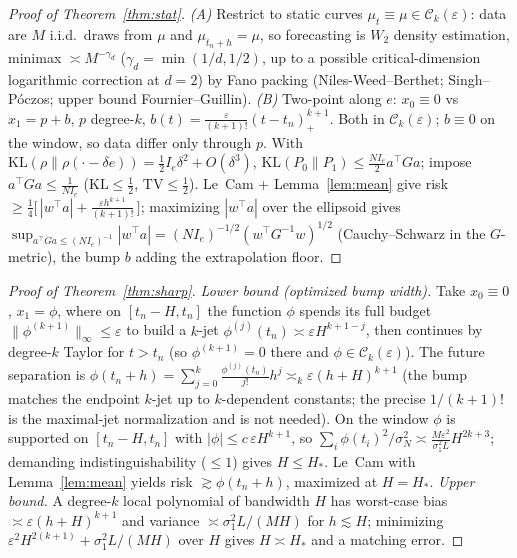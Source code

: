 \documentclass[11pt]{article}
\theoremstyle{definition}
\theoremstyle{remark}
\newcommand{\Ck}{\mathcal{C}_k(\varepsilon)}
\newcommand{\KL}{\mathrm{KL}}
\newcommand{\TV}{\mathrm{TV}}
\begin{document}
\begin{proof}[Proof of Theorem~\ref{thm:stat}]
\emph{(A)} Restrict to static curves $\mu_t\equiv\mu\in\Ck$: data are $M$ i.i.d.\ draws
from $\mu$ and $\mu_{t_n+h}=\mu$, so forecasting is $W_2$ density estimation, minimax
$\asymp M^{-\gamma_d}$ ($\gamma_d=\min(1/d,1/2)$, up to a possible critical-dimension logarithmic
correction at $d=2$) by Fano packing (Niles-Weed--Berthet; Singh--P\'oczos; upper bound
Fournier--Guillin).
\emph{(B)} Two-point along $e$: $x_0\equiv0$ vs $x_1=p+b$, $p$ degree-$k$,
$b(t)=\frac{\varepsilon}{(k+1)!}(t-t_n)_+^{k+1}$. Both in $\Ck$; $b\equiv0$ on the window,
so data differ only through $p$. With $\KL(\rho\|\rho(\cdot-\delta e))=\tfrac12 I_e\delta^2
+O(\delta^3)$, $\KL(P_0\|P_1)\le\frac{N I_e}{2}a^\top G a$; impose $a^\top G a\le\frac1{N I_e}$
($\KL\le\tfrac12$, $\TV\le\tfrac12$). Le~Cam + Lemma~\ref{lem:mean} give risk
$\ge\frac14\big[\,|w^\top a|+\frac{\varepsilon h^{k+1}}{(k+1)!}\,\big]$; maximizing $|w^\top a|$ over the
ellipsoid gives $\sup_{a^\top G a\le(N I_e)^{-1}}|w^\top a|=(N I_e)^{-1/2}(w^\top G^{-1}w)^{1/2}$
(Cauchy--Schwarz in the $G$-metric), the bump $b$ adding the extrapolation floor.
\end{proof}

\begin{proof}[Proof of Theorem~\ref{thm:sharp}]
\emph{Lower bound (optimized bump width).} Take $x_0\equiv0$, $x_1=\phi$, where on
$[t_n-H,t_n]$ the function $\phi$ spends its full budget $\|\phi^{(k+1)}\|_\infty\le\varepsilon$
to build a $k$-jet $\phi^{(j)}(t_n)\asymp\varepsilon H^{k+1-j}$, then continues by degree-$k$
Taylor for $t>t_n$ (so $\phi^{(k+1)}=0$ there and $\phi\in\Ck$). The future separation is
$\phi(t_n+h)=\sum_{j=0}^k\frac{\phi^{(j)}(t_n)}{j!}h^j\asymp_k\varepsilon(h+H)^{k+1}$ (the bump matches
the endpoint $k$-jet up to $k$-dependent constants; the precise $1/(k+1)!$ is the maximal-jet
normalization and is not needed). On the window $\phi$ is supported
on $[t_n-H,t_n]$ with $|\phi|\le c\,\varepsilon H^{k+1}$, so
$\sum_i\phi(t_i)^2/\sigma_N^2\asymp\frac{M\varepsilon^2}{\sigma_1^2 L}H^{2k+3}$; demanding
indistinguishability ($\le1$) gives $H\le H_*$. Le~Cam with Lemma~\ref{lem:mean} yields risk
$\gtrsim\phi(t_n+h)$, maximized at $H=H_*$.
\emph{Upper bound.} A degree-$k$ local polynomial of bandwidth $H$ has worst-case bias
$\asymp\varepsilon(h+H)^{k+1}$ and variance $\asymp\sigma_1^2 L/(MH)$ for $h\lesssim H$;
minimizing $\varepsilon^2 H^{2(k+1)}+\sigma_1^2 L/(MH)$ over $H$ gives $H\asymp H_*$ and a
matching error.
\end{proof}
\end{document}
